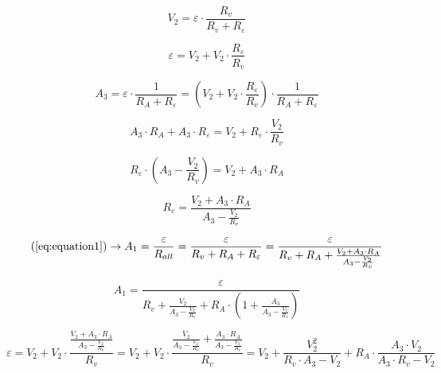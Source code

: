 \documentclass[12pt]{memoir}
\begin{document}
    \begin{equation}
        V_2 = \varepsilon \cdot \frac{R_v}{R_v + R_\varepsilon}\label{eq:equation3}
    \end{equation}

    \begin{equation*}
        \varepsilon = V_2 + V_2 \cdot \frac{R_\varepsilon}{R_v}
    \end{equation*}

    \begin{equation}
        A_3 = \varepsilon \cdot \frac{1}{R_A + R_\varepsilon} = \left(V_2 + V_2 \cdot \frac{R_\varepsilon}{R_v}\right) \cdot \frac{1}{R_A + R_\varepsilon} \label{eq:equation4}
    \end{equation}

    \begin{equation*}
        A_3 \cdot R_A + A_3 \cdot R_\varepsilon = V_2 + R_\varepsilon \cdot \frac{V_2}{R_v}
    \end{equation*}

    \begin{equation*}
        R_\varepsilon \cdot \left( A_3 - \frac{V_2}{R_v} \right) = V_2 + A_3 \cdot R_A
    \end{equation*}

    \begin{equation*}
        R_\varepsilon = \frac{V_2 + A_3 \cdot R_A}{A_3 - \frac{V_2}{R_v}}
    \end{equation*}


    \begin{equation*}
        \left(\ref{eq:equation1} \right) \rightarrow A_1 =
        \frac{\varepsilon}{R_{all}} =
        \frac{\varepsilon}{R_v + R_A + R_\varepsilon} =
        \frac{\varepsilon}{R_v + R_A + \frac{V_2 + A_3 \cdot R_A}{A_3 - \frac{V_2}{R_v}}}
    \end{equation*}


    \begin{equation*}
        A_1 = \frac{\varepsilon}{R_v + \frac{V_2}{A_3 - \frac{V_2}{R_v}} + R_A \cdot \left( 1 + \frac{A_3}{A_3 - \frac{V_2}{R_v}} \right)}
    \end{equation*}

    \begin{equation*}
        \varepsilon = V_2 + V_2 \cdot \frac{\frac{V_2 + A_3 \cdot R_A}{A_3 - \frac{V_2}{R_v}}}{R_v} = V_2 + V_2 \cdot \frac{\frac{V_2}{A_3 - \frac{V_2}{R_v}} + \frac{A_3 \cdot R_A}{A_3 - \frac{V_2}{R_v}}}{R_v} = V_2 + \frac{V_2^2}{R_v \cdot A_3 - V_2} + R_A \cdot \frac{A_3 \cdot V_2}{A_3 \cdot R_v - V_2}
    \end{equation*}
\end{document}
